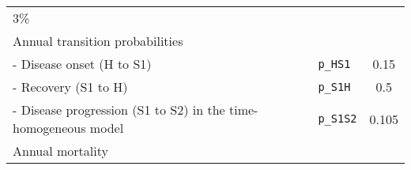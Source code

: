 \documentclass[]{article}
\begin{document}
\begin{longtable}[]{@{}llc@{}}
\begin{minipage}[t]{0.20\columnwidth}
3\%\strut
\end{minipage}\tabularnewline
\begin{minipage}[t]{0.47\columnwidth}\raggedright\strut
Annual transition probabilities\strut
\end{minipage} & \begin{minipage}[t]{0.18\columnwidth}\raggedright\strut
\strut
\end{minipage} & \begin{minipage}[t]{0.20\columnwidth}\centering\strut
\strut
\end{minipage}\tabularnewline
\begin{minipage}[t]{0.47\columnwidth}\raggedright\strut
- Disease onset (H to S1)\strut
\end{minipage} & \begin{minipage}[t]{0.18\columnwidth}\raggedright\strut
\texttt{p\_HS1}\strut
\end{minipage} & \begin{minipage}[t]{0.20\columnwidth}\centering\strut
0.15\strut
\end{minipage}\tabularnewline
\begin{minipage}[t]{0.47\columnwidth}\raggedright\strut
- Recovery (S1 to H)\strut
\end{minipage} & \begin{minipage}[t]{0.18\columnwidth}\raggedright\strut
\texttt{p\_S1H}\strut
\end{minipage} & \begin{minipage}[t]{0.20\columnwidth}\centering\strut
0.5\strut
\end{minipage}\tabularnewline
\begin{minipage}[t]{0.47\columnwidth}\raggedright\strut
- Disease progression (S1 to S2) in the time-homogeneous model\strut
\end{minipage} & \begin{minipage}[t]{0.18\columnwidth}\raggedright\strut
\texttt{p\_S1S2}\strut
\end{minipage} & \begin{minipage}[t]{0.20\columnwidth}\centering\strut
0.105\strut
\end{minipage}\tabularnewline
\begin{minipage}[t]{0.47\columnwidth}\raggedright\strut
Annual mortality\strut
\end{minipage} & \begin{minipage}[t]{0.18\columnwidth}\raggedright\strut
\strut
\end{minipage} & \begin{minipage}[t]{0.20\columnwidth}\centering\strut

\end{minipage}
\end{longtable}
\end{document}
